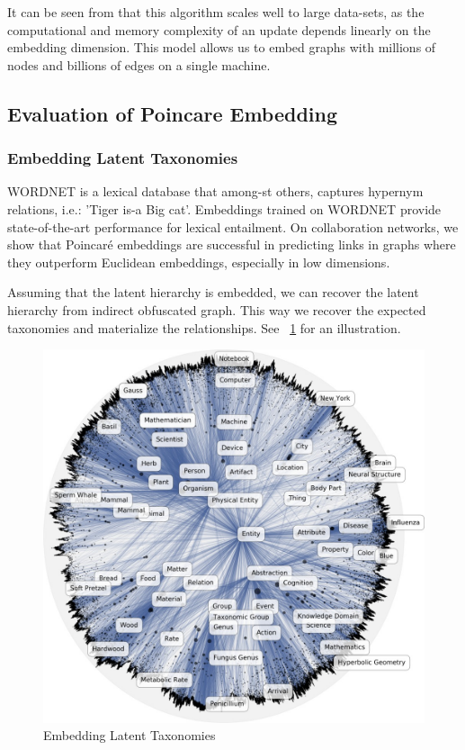 It can be seen from that this algorithm scales well to large data-sets, as the computational and memory complexity of an update depends linearly on the embedding dimension. This model allows us to embed graphs with millions of nodes and billions of edges on a single machine.

\subsection{Evaluation of Poincare Embedding}
\subsubsection{Embedding Latent Taxonomies}

WORDNET is a lexical database that among-st others, captures hypernym relations, i.e.: 'Tiger is-a Big cat'. Embeddings trained on WORDNET provide state-of-the-art performance for lexical entailment. On collaboration networks, we show that Poincaré embeddings are successful in predicting links in graphs where they outperform Euclidean embeddings, especially in low dimensions.  

Assuming that the latent hierarchy is embedded, we can recover the latent hierarchy from indirect obfuscated graph. This way we recover the expected taxonomies and materialize the relationships. See ~\ref{fig:wn-nouns} for an illustration.
\begin{figure}[htb]
  \centering
    \includegraphics[width=\textwidth]{lectures/11-b/Images/wn-nouns2.jpg}
    \caption{Embedding Latent Taxonomies}
    \label{fig:wn-nouns}
\end{figure}

